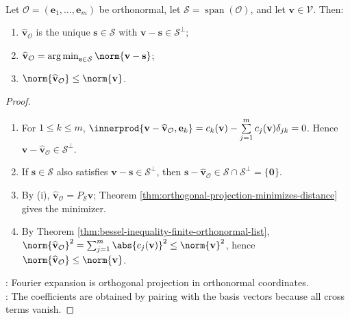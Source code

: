 \begin{theorem} \label{thm:fourier-expansion-best-approximation-finite} \\
Let $\mathcal{O}=(\mathbf{e}_1,\ldots,\mathbf{e}_m)$ be orthonormal, let $\mathcal{S}=\operatorname{span}(\mathcal{O})$, and let $\mathbf{v}\in\mathcal{V}$. Then:
\begin{enumerate}[label=\roman*.]
\setlength{\itemsep}{0pt}
\item $\widehat{\mathbf{v}}_{\mathcal{O}}$ is the unique $\mathbf{s}\in\mathcal{S}$ with $\mathbf{v}-\mathbf{s}\in\mathcal{S}^{\perp}$;
\item $\widehat{\mathbf{v}}_{\mathcal{O}}=\operatorname*{arg\,min}_{\mathbf{s}\in\mathcal{S}}\norm{\mathbf{v}-\mathbf{s}}$;
\item $\norm{\widehat{\mathbf{v}}_{\mathcal{O}}}\leq\norm{\mathbf{v}}$.
\end{enumerate}
\begin{proof}
\begin{enumerate}[label=(\roman*)]
\setlength{\itemsep}{0pt}
\item For $1\leq k\leq m$, $\innerprod{\mathbf{v}-\widehat{\mathbf{v}}_{\mathcal{O}},\mathbf{e}_k} =c_k(\mathbf{v})-\sum\limits_{j=1}^{m}c_j(\mathbf{v})\delta_{jk} =0$. Hence $\mathbf{v}-\widehat{\mathbf{v}}_{\mathcal{O}}\in\mathcal{S}^{\perp}$.\\
\item If $\mathbf{s}\in\mathcal{S}$ also satisfies $\mathbf{v}-\mathbf{s}\in\mathcal{S}^{\perp}$, then $\mathbf{s}-\widehat{\mathbf{v}}_{\mathcal{O}}\in\mathcal{S}\cap\mathcal{S}^{\perp}=\{\mathbf{0}\}$.
\item By (i), $\widehat{\mathbf{v}}_{\mathcal{O}}=P_{\mathcal{S}}\mathbf{v}$; Theorem \ref{thm:orthogonal-projection-minimizes-distance} gives the minimizer.
\item By Theorem \ref{thm:bessel-inequality-finite-orthonormal-list}, $\norm{\widehat{\mathbf{v}}_{\mathcal{O}}}^2=\sum_{j=1}^{m}\abs{c_j(\mathbf{v})}^2\leq\norm{\mathbf{v}}^2$, hence $\norm{\widehat{\mathbf{v}}_{\mathcal{O}}}\leq\norm{\mathbf{v}}$.
\end{enumerate}
: Fourier expansion is orthogonal projection in orthonormal coordinates.\\
: The coefficients are obtained by pairing with the basis vectors because all cross terms vanish.
\end{proof}
\end{theorem}

